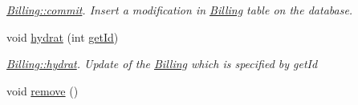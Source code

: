 \begin{DoxyCompactItemize}
\begin{DoxyCompactList}\small\item\em \hyperlink{classModels_1_1Billing_ad2280a0d8dde4c36e88c344b01044caf}{Billing\+::commit}. Insert a modification in \hyperlink{classModels_1_1Billing}{Billing} table on the database. \end{DoxyCompactList}\item 
void \hyperlink{classModels_1_1Billing_a689643008955fdcd5833631a6202c0dc}{hydrat} (int \hyperlink{classModels_1_1IDatabaseModel_a6a4d1d3c0912c97c61a9d4de7471afee}{get\+Id})
\begin{DoxyCompactList}\small\item\em \hyperlink{classModels_1_1Billing_a689643008955fdcd5833631a6202c0dc}{Billing\+::hydrat}. Update of the \hyperlink{classModels_1_1Billing}{Billing} which is specified by {\itshape get\+Id} \end{DoxyCompactList}\item 
\hypertarget{classModels_1_1Billing_ada8a7c127a80fa7349fbd6a7d30ca4a3}{void \hyperlink{classModels_1_1Billing_ada8a7c127a80fa7349fbd6a7d30ca4a3}{remove} ()}\label{classModels_1_1Billing_ada8a7c127a80fa7349fbd6a7d30ca4a3}


\end{DoxyCompactItemize}
